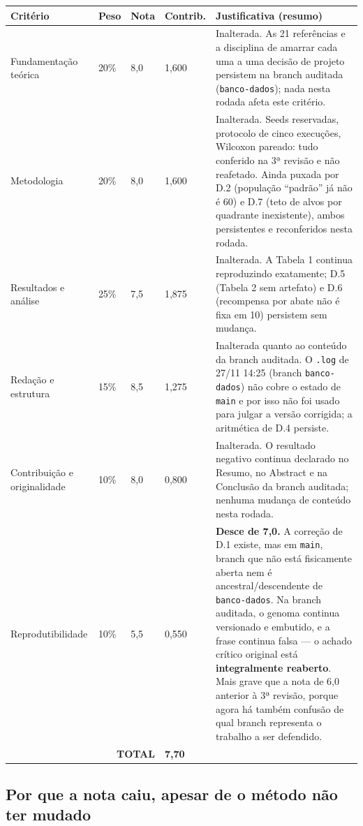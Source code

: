 \documentclass[11pt,a4paper]{article}
\begin{document}
\renewcommand{\arraystretch}{1.3}
\begin{longtable}{|p{4.1cm}|p{1.1cm}|p{1.1cm}|p{1.4cm}|p{6.6cm}|}
\hline
\textbf{Critério} & \textbf{Peso} & \textbf{Nota} & \textbf{Contrib.} & \textbf{Justificativa (resumo)} \\
\hline
\endhead
Fundamentação teórica & 20\% & 8,0 & 1,600 &
Inalterada. As 21 referências e a disciplina de amarrar cada uma a uma decisão de projeto persistem
na branch auditada (\texttt{banco-dados}); nada nesta rodada afeta este critério. \\
\hline
Metodologia & 20\% & 8,0 & 1,600 &
Inalterada. Seeds reservadas, protocolo de cinco execuções, Wilcoxon pareado: tudo conferido na 3ª
revisão e não reafetado. Ainda puxada por D.2 (população ``padrão'' já não é 60) e D.7 (teto de
alvos por quadrante inexistente), ambos persistentes e reconferidos nesta rodada. \\
\hline
Resultados e análise & 25\% & 7,5 & 1,875 &
Inalterada. A Tabela 1 continua reproduzindo exatamente; D.5 (Tabela 2 sem artefato) e D.6 (recompensa
por abate não é fixa em 10) persistem sem mudança. \\
\hline
Redação e estrutura & 15\% & 8,5 & 1,275 &
Inalterada quanto ao conteúdo da branch auditada. O \texttt{.log} de 27/11 14:25 (branch
\texttt{banco-dados}) não cobre o estado de \texttt{main} e por isso não foi usado para julgar a
versão corrigida; a aritmética de D.4 persiste. \\
\hline
Contribuição e originalidade & 10\% & 8,0 & 0,800 &
Inalterada. O resultado negativo continua declarado no Resumo, no Abstract e na Conclusão da branch
auditada; nenhuma mudança de conteúdo nesta rodada. \\
\hline
Reprodutibilidade & 10\% & 5,5 & 0,550 &
\textbf{Desce de 7,0.} A correção de D.1 existe, mas em \texttt{main}, branch que não está
fisicamente aberta nem é ancestral/descendente de \texttt{banco-dados}. Na branch auditada, o genoma
continua versionado e embutido, e a frase continua falsa --- o achado crítico original está
\textbf{integralmente reaberto}. Mais grave que a nota de 6,0 anterior à 3ª revisão, porque agora há
também confusão de qual branch representa o trabalho a ser defendido. \\
\hline
\multicolumn{3}{|r|}{\textbf{TOTAL}} & \textbf{7,70} & \\
\hline
\end{longtable}

\subsection*{Por que a nota caiu, apesar de o método não ter mudado}
\end{document}
